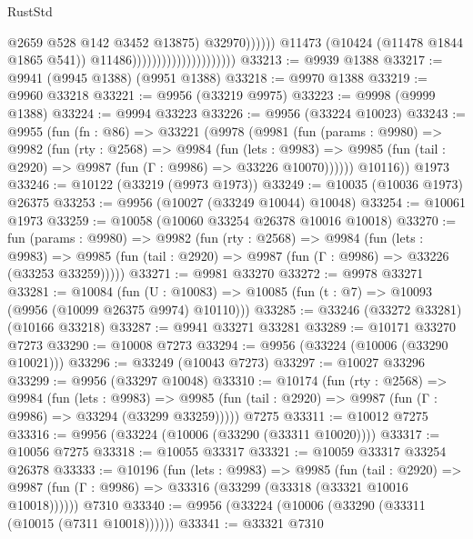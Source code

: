 \begin{lexlean}{RustStd}
\begin{coremodule}
                                                            @2659
                                                            @528
                                                            @142
                                                            @3452
                                                            @13875)
                                                          @32970))))))
                                              @11473
                                              (@10424 (@11478 @1844 @1865 @541))
                                              @11486)))))))))))))))))))))
@33213 := @9939 @1388
@33217 := @9941 (@9945 @1388) (@9951 @1388)
@33218 := @9970 @1388
@33219 := @9960 @33218
@33221 := @9956 (@33219 @9975)
@33223 := @9998 (@9999 @1388)
@33224 := @9994 @33223
@33226 := @9956 (@33224 @10023)
@33243 := @9955
    (fun (fn : @86) =>
    @33221
      (@9978
        (@9981
          (fun (params : @9980) =>
          @9982
            (fun (rty : @2568) =>
            @9984
              (fun (lets : @9983) =>
              @9985 (fun (tail : @2920) => @9987 (fun (Γ : @9986) => @33226 @10070))))))
        @10116))
    @1973
@33246 := @10122 (@33219 (@9973 @1973))
@33249 := @10035 (@10036 @1973) @26375
@33253 := @9956 (@10027 (@33249 @10044) @10048)
@33254 := @10061 @1973
@33259 := @10058 (@10060 @33254 @26378 @10016 @10018)
@33270 := fun (params : @9980) =>
  @9982
    (fun (rty : @2568) =>
    @9984
      (fun (lets : @9983) =>
      @9985 (fun (tail : @2920) => @9987 (fun (Γ : @9986) => @33226 (@33253 @33259)))))
@33271 := @9981 @33270
@33272 := @9978 @33271
@33281 := @10084
    (fun (U : @10083) => @10085 (fun (t : @7) => @10093 (@9956 (@10099 @26375 @9974) @10110)))
@33285 := @33246 (@33272 @33281) (@10166 @33218)
@33287 := @9941 @33271 @33281
@33289 := @10171 @33270 @7273
@33290 := @10008 @7273
@33294 := @9956 (@33224 (@10006 (@33290 @10021)))
@33296 := @33249 (@10043 @7273)
@33297 := @10027 @33296
@33299 := @9956 (@33297 @10048)
@33310 := @10174
    (fun (rty : @2568) =>
    @9984
      (fun (lets : @9983) =>
      @9985 (fun (tail : @2920) => @9987 (fun (Γ : @9986) => @33294 (@33299 @33259)))))
    @7275
@33311 := @10012 @7275
@33316 := @9956 (@33224 (@10006 (@33290 (@33311 @10020))))
@33317 := @10056 @7275
@33318 := @10055 @33317
@33321 := @10059 @33317 @33254 @26378
@33333 := @10196
    (fun (lets : @9983) =>
    @9985
      (fun (tail : @2920) =>
      @9987 (fun (Γ : @9986) => @33316 (@33299 (@33318 (@33321 @10016 @10018))))))
    @7310
@33340 := @9956 (@33224 (@10006 (@33290 (@33311 (@10015 (@7311 @10018))))))
@33341 := @33321 @7310

\end{coremodule}
\end{lexlean}

